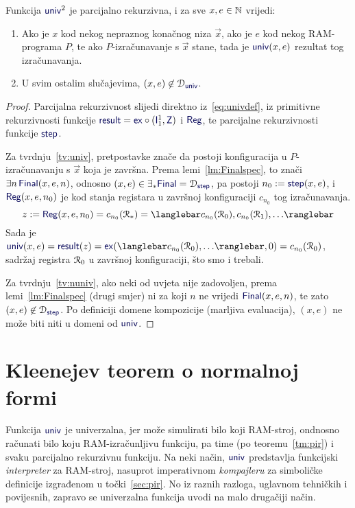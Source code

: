\begin{lema}\label{lm:univspec}
Funkcija $\f{univ}^2$ je parcijalno rekurzivna, i za sve $x,e\in{\mathbb N}$ vrijedi:
\begin{enumerate}
    \item\label{tv:univ} Ako je $x$ kod nekog nepraznog konačnog niza $\vec x$, ako je $e$ kod nekog RAM-programa $P$, te ako $P$-izračunavanje s $\vec x$ stane, tada je $\f{univ}(x,e)$ rezultat tog izračunavanja.
    \item\label{tv:nuniv} U svim ostalim slučajevima, $(x,e)\not\in\dom{\f{univ}}$.
\end{enumerate}
\end{lema}
\begin{proof}
Parcijalna rekurzivnost slijedi direktno iz~\eqref{eq:univdef}, iz primitivne rekurzivnosti funkcije $\f{result}=\f{ex}\circ(\f I_1^1,\f Z)$ i $\f{Reg}$, te parcijalne rekurzivnosti funkcije $\f{step}$.

Za tvrdnju~\ref{tv:univ}, pretpostavke znače da postoji konfiguracija u $P$-izračunavanju s $\vec x$ koja je završna. Prema lemi~\ref{lm:Finalspec}, to znači $\exists n\,\f{Final}(x,e,n)$, odnosno $(x,e)\in\exists_*\f{Final}=\dom{\f{step}}$, pa postoji $n_0:=\f{step}(x,e)$, i $\f{Reg}(x,e,n_0)$ je kod stanja registara u završnoj konfiguraciji $c_{n_0}$ tog izračunavanja.
\begin{equation}
    z:=\f{Reg}(x,e,n_0)=c_{n_0}(\reg{*})=\knk{c_{n_0}(\reg0),c_{n_0}(\reg1),\dotsc}
\end{equation}
Sada je $\f{univ}(x,e)=\f{result}(z)=\f{ex}(\knk{c_{n_0}(\reg0),\dotsc},0)=c_{n_0}(\reg0)$, sadržaj registra $\mathcal R_{0}$ u završnoj konfiguraciji, što smo i trebali.

Za tvrdnju~\ref{tv:nuniv}, ako neki od  uvjeta nije zadovoljen, prema lemi~\ref{lm:Finalspec} (drugi smjer) ni za koji $n$ ne vrijedi $\f{Final}(x,e,n)$, te zato $(x,e)\not\in\dom{\f{step}}$. Po definiciji domene kompozicije (marljiva evaluacija), $(x,e)$ ne može biti niti u domeni od $\f{univ}$.
\end{proof}

\section{Kleenejev teorem o normalnoj formi}

Funkcija $\f{univ}$ je univerzalna, jer može simulirati bilo koji RAM-stroj, ondnosno ra\-ču\-na\-ti bilo koju RAM-izračunljivu funkciju, pa time (po teoremu~\ref{tm:pir}) i svaku parcijalno rekurzivnu funkciju. Na neki način, $\f{univ}$ predstavlja funkcijski \emph{interpreter} za RAM-stroj, nasuprot imperativnom \emph{kompajleru} za simboličke definicije izgrađenom u točki~\ref{sec:pir}. No iz raznih razloga, uglavnom tehničkih i povijesnih, zapravo se univerzalna funkcija uvodi na malo drugačiji način.

